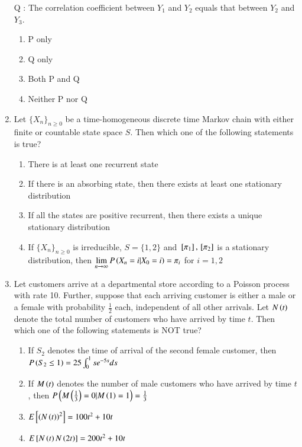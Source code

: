 \documentclass[journal]{IEEEtran}
\begin{document}
\begin{enumerate}
Q : The correlation coefficient between $Y_1$ and $Y_2$ equals that between
$Y_2$ and $Y_3$.
\begin{enumerate}
    \item P only
    \item Q only
    \item Both P and Q
    \item Neither P nor Q \\ 
\end{enumerate}
\item Let $\{X_n\}_{n \geq 0}$ be a time-homogeneous discrete time Markov chain with either finite or countable state space $S$. Then which one of the following statements is true?
\begin{enumerate}
    \item There is at least one recurrent state
    \item If there is an absorbing state, then there exists at least one stationary distribution
    \item If all the states are positive recurrent, then there exists a unique stationary distribution
    \item If $\{X_n\}_{n \geq 0}$ is irreducible, $S = \{1, 2\}$ and ${}\left[\pi_1\right], {}\left[\pi_2\right]$ is a stationary distribution, then $\lim\limits_{n\rightarrow\infty}P\left(X_n = i|X_0 =i\right) = \pi_i$ for $i = 1, 2$ \\
\end{enumerate}
\item Let customers arrive at a departmental store according to a Poisson process with rate 10. Further, suppose that each arriving customer is either a male or a female with probability $\frac{1}{2}$ each, independent of all other arrivals. Let $N\left(t\right)$ denote the total number of customers who have arrived by time $t$. Then which one of the following statements is NOT true?
\begin{enumerate}
    \item If $S_2$ denotes the time of arrival of the second female customer, then $P\left(S_2 \leq 1\right) = 25\int_{0}^{1}se^{-5s} ds$
    \item If $M\left(t\right)$ denotes the number of male customers who have arrived by time $t$, then $P\left(M\left(\frac{1}{3}\right) = 0|M\left(1\right) = 1\right) = \frac{1}{3}$
    \item $E{}\left[\left(N\left(t\right)\right)^2\right] = 100t^2 + 10t$
    \item $E{}\left[N\left(t\right)N\left(2t\right)\right] = 200t^2 + 10t$ \\
\end{enumerate}

\end{enumerate}
\end{document}
